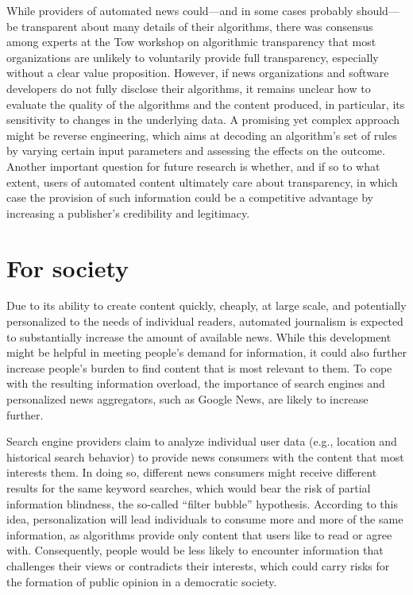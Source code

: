 \documentclass[notoc, symmetric, nobib, nols]{towcenter-guideto-book}
\begin{document}
While providers of automated news could---and in some cases probably should---be transparent about many details of their algorithms, there was consensus among experts at the Tow workshop on algorithmic transparency that most organizations are unlikely to voluntarily provide full transparency, especially without a clear value proposition. However, if news organizations and software developers do not fully disclose their algorithms, it remains unclear how to evaluate the quality of the algorithms and the content produced, in particular, its sensitivity to changes in the underlying data. A promising yet complex approach might be reverse engineering, which aims at decoding an algorithm's set of rules by varying certain input parameters and assessing the effects on the outcome.\autocite{diak152} Another important question for future research is whether, and if so to what extent, users of automated content ultimately care about transparency, in which case the provision of such information could be a competitive advantage by increasing a publisher's credibility and legitimacy.\autocite{diak15}

\section{For society}

Due to its ability to create content quickly, cheaply, at large scale, and potentially personalized to the needs of individual readers, automated journalism is expected to substantially increase the amount of available news. While this development might be helpful in meeting people's demand for information, it could also further increase people's burden to find content that is most relevant to them. To cope with the resulting information overload, the importance of search engines and personalized news aggregators, such as Google News, are likely to increase further. 

Search engine providers claim to analyze individual user data (e.g., location and historical search behavior) to provide news consumers with the content that most interests them. In doing so, different news consumers might receive different results for the same keyword searches, which would bear the risk of partial information blindness, the so-called ``filter bubble'' hypothesis.\autocite{paris11} According to this idea, personalization will lead individuals to consume more and more of the same information, as algorithms provide only content that users like to read or agree with. Consequently, people would be less likely to encounter information that challenges their views or contradicts their interests, which could carry risks for the formation of public opinion in a democratic society. 
\end{document}
